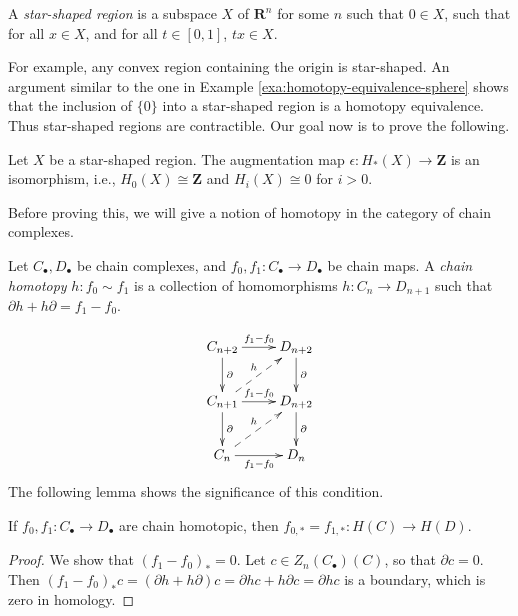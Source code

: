 \begin{definition}
	A \emph{star-shaped region} is a subspace $X$ of $\mathbf{R}^n$ for some $n$ such that $0\in X$, such that for all $x\in X$, and for all $t\in[0,1]$, $tx\in X$. 
\end{definition}
For example, any convex region containing the origin is star-shaped. An argument similar to the one in Example \ref{exa:homotopy-equivalence-sphere} shows that the inclusion of $\{0\}$ into a star-shaped region is a homotopy equivalence. Thus star-shaped regions are contractible. Our goal now is to prove the following.
\begin{theorem}\label{thm:star-shaped-homology}
	Let $X$ be a star-shaped region. The augmentation map $\epsilon: H_\ast(X)\to \mathbf{Z}$ is an isomorphism, i.e., $ H_0(X)\cong\mathbf{Z}$ and $ H_i(X)\cong 0$ for $i>0$.
\end{theorem}
Before proving this, we will give a notion of homotopy in the category of chain complexes.
\begin{definition}
Let $C_\bullet,D_\bullet$ be chain complexes, and $f_0,f_1:C_\bullet\to D_\bullet$ be chain maps. A \emph{chain homotopy} $h:f_0\sim f_1$ is a collection of homomorphisms $h:C_n\to D_{n+1}$ such that $\partial h+h\partial=f_1-f_0$.
\end{definition}
			\begin{equation*}
			\xymatrix{C_{n+2}\ar[r]^{f_1-f_0}\ar[d]^\partial & D_{n+2}\ar[d]^\partial\\
			C_{n+1}\ar@{-->}[ur]^h\ar[r]^{f_1-f_0}\ar[d]^\partial & D_{n+2}\ar[d]^\partial\\
			C_n\ar@{-->}[ur]^h\ar[r]_{f_1-f_0} & D_n}
			\end{equation*}
The following lemma shows the significance of this condition.
\begin{lemma}
	If $f_0,f_1:C_\bullet\to D_\bullet$ are chain homotopic, then $f_{0,\ast}=f_{1,\ast}: H(C)\to H(D)$.
\end{lemma}
\begin{proof}
	We show that $(f_1-f_0)_\ast=0$. Let $c\in Z_n(C_\bullet)(C)$, so that $\partial c=0$. Then $(f_1-f_0)_\ast c=(\partial h+h\partial)c=\partial hc+h\partial c=\partial hc$ is a boundary, which is zero in homology.
\end{proof}

